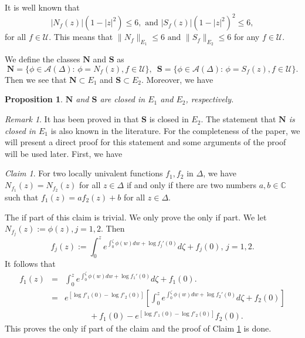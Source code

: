 \documentclass[11pt]{amsart}
\newtheorem{proposition}[theorem]{Proposition}
\theoremstyle{remark}
\newtheorem{remark}[theorem]{Remark}
\theoremstyle{claim}
\newtheorem{claim}[theorem]{Claim}
\theoremstyle{definition}
\theoremstyle{problem}
\theoremstyle{conjecture}
\theoremstyle{question}
\numberwithin{equation}{section}
\begin{document}
It is well known that
 $$|N_f(z)|(1-|z|^2)\leq 6,\,\,{\text {and}}\,\, |S_f(z)|(1-|z|^2)^2\leq 6,$$
 for all $f\in \mathcal{U}$.  This means that
  $\|N_f\|_{E_1}\leq 6\,\,{\text {and}}\,\, \|S_f\|_{E_2}\leq 6$ for any $f\in \mathcal{U}$.

 We define the classes $\mathbf{N}$ and $\mathbf{S}$ as
$$
 \mathbf{N}=\{\phi \in \mathcal{A}(\Delta): \, \phi=N_f(z), f\in \mathcal{U}\}, \,\,\,
 \mathbf{S}=\{\phi \in \mathcal{A}(\Delta): \, \phi=S_f(z), f\in \mathcal{U}\}.
$$
Then we see that $\mathbf{N} \subset E_1$ and $\mathbf{S} \subset E_2$. Moreover, we have
\begin{proposition}\label{pro-2}
$\mathbf{N}$ and $\mathbf{S}$ are closed in $E_1$ and  $E_2$, respectively.
\end{proposition}
\begin{remark} It has been proved in \cite[Page 115]{L} that $\mathbf{S}$ is closed in $E_2$.  The statement that {\em $\mathbf{N}$ is closed in $E_1$} is also known in the literature. For the 
completeness of the paper, we will present a direct proof for this statement and some arguments of the proof will be used later.  First, we have
\begin{claim}\label{cla---}
For two locally univalent functions $f_1, f_2$ in $\Delta$, we have
$N_{f_1}(z)=N_{f_2}(z)$ for all $z\in \Delta$ if and only if there are two numbers $a, b\in \mathbb{C}$ such that $f_1(z)=af_2(z)+b$ for all $z\in \Delta$.
\end{claim}
The if part of this claim is trivial. We only prove the only if part. We let $N_{f_j}(z):=\phi(z), j=1,2$. Then
$$f_{j}(z):=\int_{0}^{z} e^{\int_{0}^{\zeta}\phi(w) dw+\log f_{j}'(0)}d\zeta+f_j(0),\, j=1,2.$$
It follows that
\begin{eqnarray}f_1(z) \nonumber &=&\int_{0}^{z} e^{\int_{0}^{\zeta}\phi(w) dw+\log f_{1}'(0)}d\zeta+f_1(0).\\&=&e^{[\log f'_1(0)-\log f'_2(0)]}[\int_{0}^{z} e^{\int_{0}^{\zeta}\phi(w) dw+\log f_{2}'(0)}d\zeta+f_2(0)]
\nonumber \\
&&\quad\quad\quad +f_1(0)-e^{[\log f'_1(0)-\log f'_2(0)]}f_2(0) .\nonumber
\end{eqnarray}
This proves the only if part of the claim and the proof of Claim \ref{cla---} is done.


\end{remark}
\end{document}
